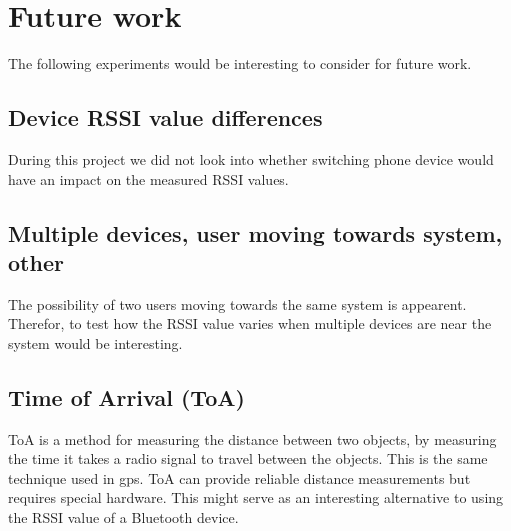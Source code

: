 \section{Future work}
The following experiments would be interesting to consider for future work.


\subsection{Device RSSI value differences}

During this project we did not look into whether switching phone device would have an impact on the measured RSSI values.


\subsection{Multiple devices, user moving towards system, other}


The possibility of two users moving towards the same system is appearent. Therefor, to test how the RSSI value varies when multiple devices are near the system would be interesting.


\subsection{Time of Arrival (ToA)}
ToA is a method for measuring the distance between two objects, by measuring the time it takes a radio signal to travel between the objects. This is the same technique used in gps. ToA can provide reliable distance measurements but requires special hardware. This might serve as an interesting alternative to using the RSSI value of a Bluetooth device.
